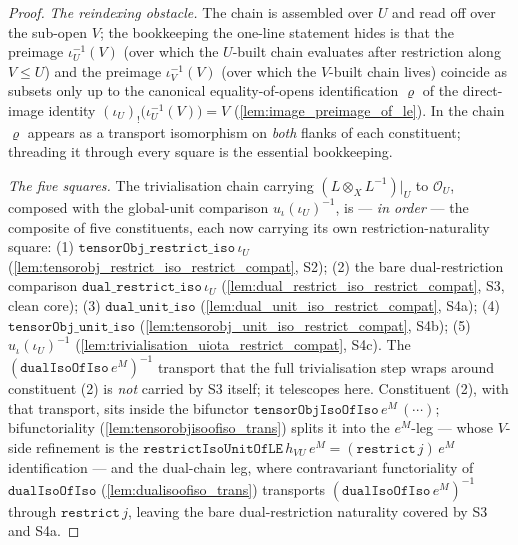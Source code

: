 \begin{proof}

  \emph{The reindexing obstacle.} The chain is assembled over \(U\) and read off over the sub-open
  \(V\); the bookkeeping the one-line statement hides is that the preimage \(\iota_U^{-1}(V)\) (over
  which the \(U\)-built chain evaluates after restriction along \(V \le U\)) and the preimage
  \(\iota_V^{-1}(V)\) (over which the \(V\)-built chain lives) coincide as subsets only up to the
  canonical equality-of-opens identification \(\varrho\) of the direct-image identity
  \((\iota_U)_!\bigl(\iota_U^{-1}(V)\bigr) = V\) (\cref{lem:image_preimage_of_le}). In the chain
  \(\varrho\) appears as a transport isomorphism on \emph{both} flanks of each constituent;
  threading it through every square is the essential bookkeeping.

  \emph{The five squares.} The trivialisation chain carrying \((L \otimes_X L^{-1})|_U\) to
  \(\mathcal{O}_U\), composed with the global-unit comparison \(u_\iota(\iota_U)^{-1}\), is --- \emph{in
  order} --- the composite of five constituents, each now carrying its own restriction-naturality
  square: (1) \(\mathtt{tensorObj\_restrict\_iso}\,\iota_U\)
  (\cref{lem:tensorobj_restrict_iso_restrict_compat}, S2); (2) the bare dual-restriction comparison
  \(\mathtt{dual\_restrict\_iso}\,\iota_U\) (\cref{lem:dual_restrict_iso_restrict_compat}, S3, clean
  core); (3) \(\mathtt{dual\_unit\_iso}\)
  (\cref{lem:dual_unit_iso_restrict_compat}, S4a); (4) \(\mathtt{tensorObj\_unit\_iso}\)
  (\cref{lem:tensorobj_unit_iso_restrict_compat}, S4b); (5) \(u_\iota(\iota_U)^{-1}\)
  (\cref{lem:trivialisation_uiota_restrict_compat}, S4c). The \((\mathtt{dualIsoOfIso}\,e^M)^{-1}\)
  transport that the full trivialisation step wraps around constituent (2) is \emph{not} carried by
  S3 itself; it telescopes here. Constituent (2), with that transport, sits inside the bifunctor
  \(\mathtt{tensorObjIsoOfIso}\,e^M\,(\cdots)\); bifunctoriality (\cref{lem:tensorobjisoofiso_trans})
  splits it into the \(e^M\)-leg --- whose \(V\)-side refinement is the
  \(\mathtt{restrictIsoUnitOfLE}\,h_{VU}\,e^M = (\mathtt{restrict}\,j)\,e^M\) identification --- and
  the dual-chain leg, where contravariant functoriality of \(\mathtt{dualIsoOfIso}\)
  (\cref{lem:dualisoofiso_trans}) transports \((\mathtt{dualIsoOfIso}\,e^M)^{-1}\) through
  \(\mathtt{restrict}\,j\), leaving the bare dual-restriction naturality covered by S3 and S4a.


\end{proof}
